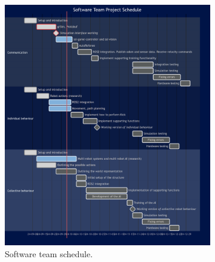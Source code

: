 \begin{figure}
    \centering
    \begin{subfigure}[b]{0.55\textwidth}
       \includegraphics[width=0.95\linewidth]{images/DVA490_software_team_project_schedule.png}
       \caption{Software team schedule.}
       \label{fig:software_schedule} 
    \end{subfigure}
    \hfill
    \begin{subfigure}[b]{0.55\textwidth}

\end{subfigure}
\end{figure}
